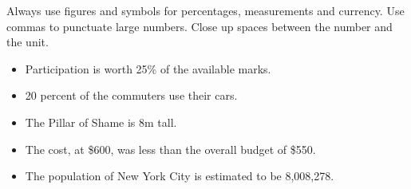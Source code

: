 \documentclass[11pt,a4paper]{book}
\newcommand{\xmark}{{\color{cadmiumred}\ding{54}}}%
\newcommand{\cmark}{{\color{green(html/cssgreen)}\checkmark}}%
\begin{document}
			Always use figures and symbols for percentages, measurements and currency. Use commas to punctuate large numbers. Close up spaces between the number and the unit.
			{\firasans \begin{mdframed}[backgroundcolor=aliceblue] \begin{itemize}[label=\cmark]
				\item  Participation is worth 25\% of the available marks.
				\item[\xmark] 20 percent of the commuters use their cars.
				\item The Pillar of Shame is 8m tall.
				\item The cost, at \$600, was less than the overall budget of \$550.
				\item The population of New York City is estimated to be 8,008,278.
			\end{itemize} \end{mdframed} }
\end{document}
